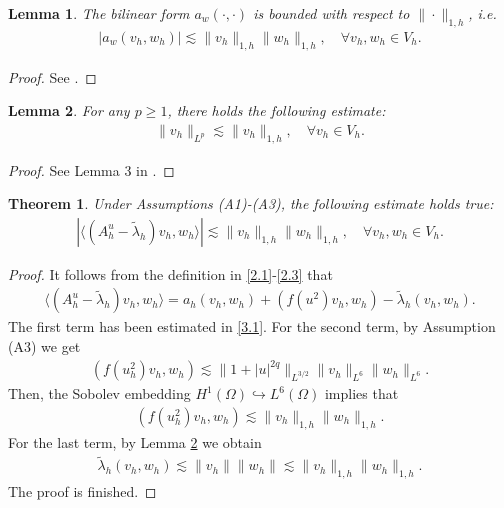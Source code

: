 \documentclass[compress, preprint,9pt]{elsarticle}
\numberwithin{equation}{section}
\newtheorem{lemma}{Lemma}[section]
\newtheorem{theo}{Theorem}[section]
\newcommand{\eps}{\varepsilon}
\newcommand{\la}{\langle}
\newcommand{\ran}{\rangle}
\begin{document}
\begin{lemma}
	The bilinear form $a_w(\cdot,\cdot)$ is bounded with respect to $\|\cdot\|_{1,h}$, i.e.
	\begin{eqnarray}\label{3.1}
		|a_w(v_h,w_h)|\lesssim\|v_h\|_{1,h}\|w_h\|_{1,h}, \quad\forall v_h,w_h\in V_h.
	\end{eqnarray}
\end{lemma}
\begin{proof}
	See \cite{Mu2013c,Ye2020,Zhai2019c}.
\end{proof}


\begin{lemma}\label{lem6}
	For any $p\ge1$, there holds the following estimate:
	\begin{eqnarray*}
		\|v_h\|_{L^p}\lesssim\|v_h\|_{1,h}, \quad\forall v_h\in V_h.
	\end{eqnarray*}
\end{lemma}
\begin{proof}
	See Lemma 3 in \cite{Maday2023}.
\end{proof}


\begin{theo}\label{theo1}
	Under Assumptions (A1)-(A3), the following estimate holds true:
	\begin{eqnarray*}
		\left|\la (A_h^u-\widetilde{\lambda}_h)v_h,w_h\ran\right|\lesssim \|v_h\|_{1,h}\|w_h\|_{1,h}, \quad\forall v_h,w_h\in V_h.
	\end{eqnarray*}
\end{theo}
\begin{proof}
	It follows from the definition in \eqref{2.1}-\eqref{2.3} that
	\begin{eqnarray*}
		\la (A_h^u-\widetilde{\lambda}_h)v_h,w_h\ran=a_h(v_h,w_h)+(f(u^2)v_h,w_h)-\widetilde{\lambda}_h(v_h,w_h).
	\end{eqnarray*}
	The first term has been estimated in \eqref{3.1}. For the second term, by Assumption (A3) we get
	\begin{eqnarray*}
		(f(u_h^2)v_h,w_h)\lesssim \|1+|u|^{2q}\|_{L^{3/2}}\|v_h\|_{L^6}\|w_h\|_{L^6}.
	\end{eqnarray*}
	Then, the Sobolev embedding $H^1(\Omega)\hookrightarrow L^6(\Omega)$ implies that
	\begin{eqnarray*}
		(f(u_h^2)v_h,w_h)\lesssim\|v_h\|_{1,h}\|w_h\|_{1,h}.
	\end{eqnarray*}
	For the last term, by Lemma \ref{lem6} we obtain
	\begin{eqnarray*}
		\widetilde{\lambda}_h(v_h,w_h)\lesssim\|v_h\|\|w_h\|\lesssim\|v_h\|_{1,h}\|w_h\|_{1,h}.
	\end{eqnarray*}
	The proof is finished.
\end{proof}
\end{document}
